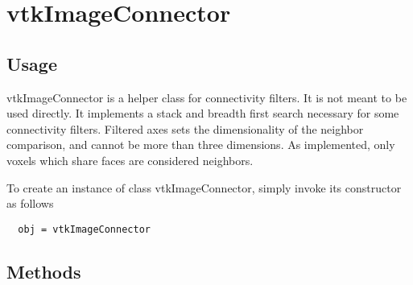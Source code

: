 \section{vtkImageConnector}

\subsection{Usage}

 vtkImageConnector is a helper class for connectivity filters.  
 It is not meant to be used directly.
 It implements a stack and breadth first search necessary for
 some connectivity filters.  Filtered axes sets the dimensionality 
 of the neighbor comparison, and
 cannot be more than three dimensions.  
 As implemented, only voxels which share faces are considered
 neighbors. 

To create an instance of class vtkImageConnector, simply
invoke its constructor as follows
\begin{verbatim}
  obj = vtkImageConnector
\end{verbatim}
\subsection{Methods}

